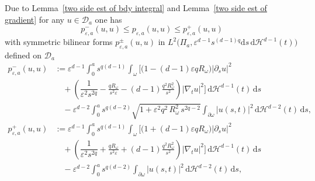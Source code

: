 \documentclass[11pt,oneside,reqno,a4paper]{amsart}
\newcommand{\dd}{\mathrm{d}}
\newcommand{\cD}{\mathcal{D}}
\renewcommand{\H}{\mathcal{H}}
\newcommand{\eps}{\varepsilon}
\theoremstyle{definition}
\begin{document}
Due to Lemma~\ref{two side est of bdy integral} and Lemma~\ref{two side est of gradient} for any $u\in\cD_a$ one has
\[
p^-_{\eps,a}(u,u)\le p_{\eps,a}(u,u)\le p^+_{\eps,a}(u,u)
\]
with symmetric bilinear forms $p^\pm_{\eps,a}(u,u)$ in $L^2\big(\Pi_a,\eps^{d-1}s^{(d-1)q}\dd s \,\dd\H^{d-1}(t)\big)$ defined on $\cD_a$
\begin{align*}
	p^-_{\eps,a}(u,u)&:=\eps^{d-1}\int_0^a s^{q(d-1)}\int_{\omega}\Bigg[\big(1-(d-1)\eps qR_\omega\big)|\partial_su|^2\\
	&\quad +\left(\dfrac{1}{\eps^2s^{2q}}-\frac{qR_\omega}{s^2\eps}-(d-1)\frac{q^2R^2_\omega}{s^2}\right)|\nabla_tu|^2\Bigg]\,\dd\H^{d-1}(t)\,\dd s\\
	&\quad- \eps^{d-2}\int_0^a
	s^{q(d-2)}\sqrt{1+\eps^2q^2\,R_\omega^2\,s^{2q-2}}\int_{\partial\omega}\big|u(s,t)\big|^2\,\dd\H^{d-2}(t)\,\dd s,\\
	p^+_{\eps,a}(u,u)&:=\eps^{d-1}\int_0^a s^{q(d-1)}\int_{\omega}\Bigg[\big(1+(d-1)\eps qR_\omega\big)|\partial_su|^2\\
	&\quad +\left(\dfrac{1}{\eps^2s^{2q}}+\frac{qR_\omega}{s^2\eps}+(d-1)\frac{q^2R^2_\omega}{s^2}\right)|\nabla_tu|^2\Bigg]\,\dd\H^{d-1}(t)\,\dd s\\
	&\quad -\eps^{d-2}\int_0^a
	s^{q(d-2)}\int_{\partial\omega}\big|u(s,t)\big|^2\,\dd\H^{d-2}(t)\,\dd s,
\end{align*}
\end{document}
